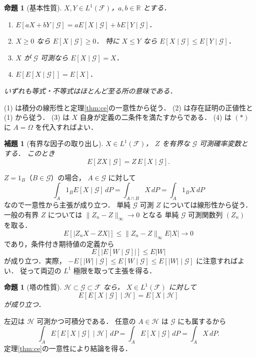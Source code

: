 \documentclass[a5paper,10pt,onecolumn]{jsarticle}
\makeatletter
\theoremstyle{mathnotetheorem}
\newtheorem{lemma}[theorem]{補題}
\newtheorem{proposition}[theorem]{命題}
\renewcommand{\proofname}{証明}
\renewenvironment{proof}[1][\proofname]{%
  \par\pushQED{\qed}\normalfont\topsep4\p@\@plus2\p@\relax
  \trivlist\item[\hskip\labelsep\bfseries #1]\ignorespaces
}{\popQED\endtrivlist\@endpefalse}
\newcommand{\norm}[1]{\lVert #1\rVert}
\makeatother
\begin{document}
\begin{proposition}[基本性質]\label{prop:ce-basic}
$X,Y\in L^1(\mathcal F)$，$a,b\in\mathbb R$ とする．
\begin{enumerate}
\item $E[aX+bY\mid\mathcal G]
 =aE[X\mid\mathcal G]+bE[Y\mid\mathcal G]$．
\item $X\ge0$ なら $E[X\mid\mathcal G]\ge0$．
特に $X\le Y$ なら
$E[X\mid\mathcal G]\le E[Y\mid\mathcal G]$．
\item $X$ が $\mathcal G$ 可測なら
$E[X\mid\mathcal G]=X$．
\item $E[E[X\mid\mathcal G]]=E[X]$．
\end{enumerate}
いずれも等式・不等式はほとんど至る所の意味である．
\end{proposition}
\begin{proof}
(1) は積分の線形性と定理\ref{thm:ce}の一意性から従う．
(2) は存在証明の正値性と (1) から従う．
(3) は $X$ 自身が定義の二条件を満たすからである．
(4) は $(*)$ に $A=\Omega$ を代入すればよい．
\end{proof}

\begin{lemma}[有界な因子の取り出し]\label{lem:pullout}
$X\in L^1(\mathcal F)$，
$Z$ を有界な $\mathcal G$ 可測確率変数とする．
このとき
\[
 E[ZX\mid\mathcal G]=Z\,E[X\mid\mathcal G].
\]
\end{lemma}
\begin{proof}
$Z=1_B$（$B\in\mathcal G$）の場合，
$A\in\mathcal G$ に対して
\[
 \int_A1_B E[X\mid\mathcal G]\,dP
 =\int_{A\cap B}X\,dP
 =\int_A1_BX\,dP
\]
なので一意性から主張が成り立つ．
単純 $\mathcal G$ 可測 $Z$ については線形性から従う．
一般の有界 $Z$ については
$\norm{Z_n-Z}_\infty\to0$ となる
単純 $\mathcal G$ 可測関数列 $(Z_n)$ を取る．
\[
 E[|Z_nX-ZX|]
 \le\norm{Z_n-Z}_\infty E|X|\to0
\]
であり，条件付き期待値の定義から
\[
 E[|E[W\mid\mathcal G]|]
 \le E|W|
 \tag{$**$}
\]
が成り立つ．実際，
$-E[|W|\mid\mathcal G]\le E[W\mid\mathcal G]
\le E[|W|\mid\mathcal G]$ に注意すればよい．
従って両辺の $L^1$ 極限を取って主張を得る．
\end{proof}

\begin{proposition}[塔の性質]\label{prop:tower}
$\mathcal H\subset\mathcal G\subset\mathcal F$ なら，
$X\in L^1(\mathcal F)$ に対して
\[
 E[E[X\mid\mathcal G]\mid\mathcal H]
   =E[X\mid\mathcal H]
\]
が成り立つ．
\end{proposition}
\begin{proof}
左辺は $\mathcal H$ 可測かつ可積分である．
任意の $A\in\mathcal H$ は $\mathcal G$ にも属するから
\[
 \int_A E[E[X\mid\mathcal G]\mid\mathcal H]\,dP
 =\int_AE[X\mid\mathcal G]\,dP
 =\int_AX\,dP.
\]
定理\ref{thm:ce}の一意性により結論を得る．
\end{proof}
\end{document}
